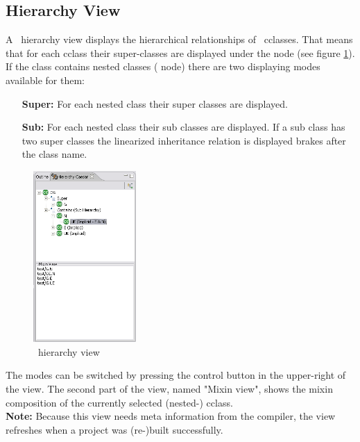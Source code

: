 \subsection{Hierarchy View\label{hierarchyview}}
A \caesarj ~hierarchy view displays the hierarchical relationships of \caesarj ~cclasses. That means that for each cclass their super-classes are displayed under the  node (see figure \ref{fig:hierarchy_view}). If the class contains nested classes ( node) there are two displaying modes available for them:
\begin{itemize}
	\item[\textbf{Super:}] For each nested class their super classes are displayed.
	\item[\textbf{Sub:}] For each nested class their sub classes are displayed. If a sub class has two super classes the linearized inheritance relation is displayed brakes after the class name.
\end{itemize}

\begin{figure}[htbp]
	\centering
		\includegraphics[width=0.35\textwidth]{images/hierarchy.png}
	\caption{\caesarj ~hierarchy view}
	\label{fig:hierarchy_view}
\end{figure}

The modes can be switched by pressing the control button in the upper-right of the view. The second part of the view, named "Mixin view", shows the mixin composition of the currently selected (nested-) cclass.\\
\textbf{Note:} Because this view needs meta information from the compiler, the view refreshes when a project was (re-)built successfully.

